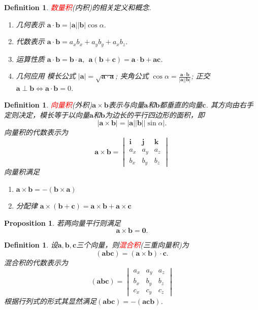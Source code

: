\documentclass{article}
\newcommand{\mbf}[1]{\bm{#1}}
\newtheorem{proposition}[theorem]{Proposition}
\newtheorem{definition}[theorem]{Definition}
\newcommand{\redt}[1]{\textcolor{red}{#1}}
\begin{document}
\begin{definition}
\rm \redt{数量积}(内积)的相关定义和概念.
\begin{enumerate}
	\item 几何表示 $\mbf{a} \cdot \mbf{b} = |\mbf{a}| |\mbf{b}| \cos \alpha$.
	\item 代数表示 $\mbf{a} \cdot \mbf{b} = a_xb_x + a_yb_y + a_xb_z$.
	\item 运算性质 $\mbf{a} \cdot \mbf{b} = \mbf{b} \cdot \mbf{a},~~ \mbf{a}(\mbf{b} + \mbf{c}) = \mbf{a} \cdot \mbf{b} + \mbf{a}\mbf{c}$. 
	\item 几何应用 模长公式 $|\mbf{a}| = \sqrt{\mbf{a}\cdot\mbf{a}}$; 夹角公式 $\cos \alpha = \frac{\mbf{a}\cdot\mbf{b}}{|\mbf{a}||\mbf{b}|}$; 正交 $\mbf{a} \perp \mbf{b} \Leftrightarrow \mbf{a}\cdot\mbf{b} = 0$. 
\end{enumerate}
\end{definition}

\begin{definition}
\rm \redt{向量积}(外积)$\mbf{a}\times \mbf{b}$表示与向量$\mbf{a}$和$\mbf{b}$都垂直的向量$\mbf{c}$. 其方向由右手定则决定，模长等于以向量$\mbf{a}$和$\mbf{b}$为边长的平行四边形的面积，即
$$
|\mbf{a} \times \mbf{b}| = |\mbf{a}||\mbf{b}||\sin\alpha|. 
$$
向量积的代数表示为
$$
\mbf{a}\times\mbf{b} = \begin{vmatrix}
\mbf{i} & \mbf{j} & \mbf{k} \\
a_x & a_y & a_z \\
b_x & b_y & b_z 
\end{vmatrix}
$$
向量积满足
\begin{enumerate}
\item $\mbf{a} \times \mbf{b} = - (\mbf{b} \times \mbf{a})$
\item 分配律 $\mbf{a} \times (\mbf{b}+\mbf{c}) = \mbf{a}\times\mbf{b} +  \mbf{a}\times\mbf{c}$
\end{enumerate}

\end{definition}

\begin{proposition}
\rm 若两向量平行则满足
$$
\mbf{a} \times \mbf{b} = \mbf{0}.
$$
\end{proposition}

\begin{definition}
\rm 设$\mbf{a},\mbf{b},\mbf{c}$三个向量，则\redt{混合积}(三重向量积)为
$$
(\mbf{a}\mbf{b}\mbf{c}) = (\mbf{a} \times \mbf{b}) \cdot \mbf{c}. 
$$
混合积的代数表示为
$$
(\mbf{a}\mbf{b}\mbf{c}) = \begin{vmatrix}
a_x & a_y & a_z \\
b_x & b_y & b_z \\
c_x & c_y & c_z 
\end{vmatrix}
$$
根据行列式的形式其显然满足$(\mbf{a}\mbf{b}\mbf{c}) = -(\mbf{a}\mbf{c}\mbf{b})$. 
\end{definition}
\end{document}
